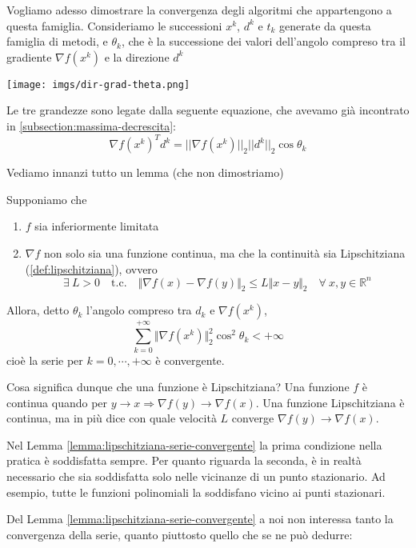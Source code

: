 Vogliamo adesso dimostrare la convergenza degli algoritmi che
appartengono a questa famiglia. Consideriamo le successioni $x^k$,
$d^k$ e $t_k$ generate da questa famiglia di metodi, e $ \theta_{k}$,
che \`e la successione dei valori dell'angolo compreso tra il gradiente
$\nabla f(x^{k})$ e la direzione $d^{k}$

\centerline{\texttt{[image: imgs/dir-grad-theta.png]}}

Le tre grandezze sono legate dalla seguente equazione, che avevamo gi\`a
incontrato in \ref{subsection:massima-decrescita}:
$$ \nabla f(x^{k})^{T} d^{k} = || \nabla f(x^{k}) ||_2 ||d^{k}||_2 \cos \theta_{k}$$

Vediamo innanzi tutto un lemma (che non dimostriamo)
\begin{lemma}
\label{lemma:lipschitziana-serie-convergente} Supponiamo che
 \begin{enumerate}
  \item $f$ sia inferiormente limitata
  \item $\nabla f$ non solo sia una funzione continua, ma che la
continuit\`a sia Lipschitziana (\ref{def:lipschitziana}), ovvero
      $$ \exists ~ L>0 \quad \text{t.c.} \quad \Vert \nabla f(x) - \nabla f(y) \Vert_{2} \leq L \Vert x - y \Vert_{2} \quad \forall ~ x,y \in \mathbb{R}^n$$
 \end{enumerate} Allora, detto $\theta_{k}$ l'angolo compreso tra $d_k$ e $\nabla f (x^k)$,
$$ \sum_{k=0}^{+\infty} \Vert \nabla f(x^{k}) \Vert_2^2 \cos^{2} \theta_{k} < + \infty$$
cio\`e la serie per $k= 0, \cdots, +\infty $ \`e convergente.
\end{lemma}

\begin{notes} Cosa significa dunque che una funzione \`e Lipschitziana?
Una funzione $f$ \`e continua quando per $y \to x \Longrightarrow \nabla
f(y) \to \nabla f(x)$. Una funzione Lipschitziana \`e continua, ma in
pi\`u dice con quale velocit\`a $L$ converge $\nabla f(y) \to \nabla
f(x)$.
\end{notes}
\begin{notes} Nel Lemma \ref{lemma:lipschitziana-serie-convergente} la
prima condizione nella pratica \`e soddisfatta sempre. Per quanto
riguarda la seconda, \`e in realt\`a necessario che sia soddisfatta solo
nelle vicinanze di un punto stazionario. Ad esempio, tutte le funzioni
polinomiali la soddisfano vicino ai punti stazionari.
\end{notes}

Del Lemma \ref{lemma:lipschitziana-serie-convergente} a noi non
interessa tanto la convergenza della serie, quanto piuttosto quello
che se ne può dedurre:

